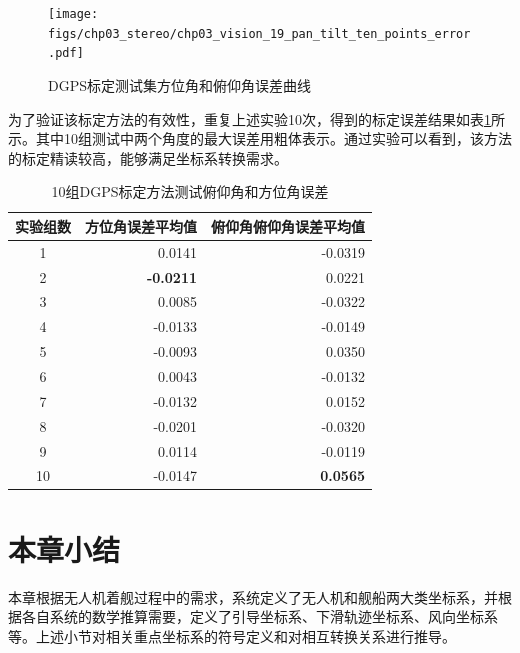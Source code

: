 \begin{figure}[htb]
	\centering
	\texttt{[image: figs/chp03\_stereo/chp03\_vision\_19\_pan\_tilt\_ten\_points\_error.pdf]}	
	\caption{DGPS标定测试集方位角和俯仰角误差曲线}
	\label{fig:chp03_vision_19_pan_tilt_ten_points_error}
\end{figure}

为了验证该标定方法的有效性，重复上述实验10次，得到的标定误差结果如表\ref{label:DGPS_10_Test_Results}所示。其中10组测试中两个角度的最大误差用粗体表示。通过实验可以看到，该方法的标定精读较高，能够满足坐标系转换需求。
\begin{table}[htb]
	\centering
	\caption{10组DGPS标定方法测试俯仰角和方位角误差}
	\label{label:DGPS_10_Test_Results}
	\begin{tabular}{crr}
		\hline
		实验组数 & \multicolumn{1}{c}{方位角误差平均值} & \multicolumn{1}{c}{俯仰角俯仰角误差平均值} \\ \hline
		1    & 0.0141                       & -0.0319                         \\
		2    & \textbf{-0.0211}             & 0.0221                          \\
		3    & 0.0085                       & -0.0322                \\
		4    & -0.0133                      & -0.0149                         \\
		5    & -0.0093                      & 0.0350                          \\
		6    & 0.0043                       & -0.0132                         \\
		7    & -0.0132                      & 0.0152                          \\
		8    & -0.0201                      & -0.0320                         \\
		9    & 0.0114                       & -0.0119                         \\
		10   & -0.0147                      & \textbf{0.0565}                          \\ \hline
	\end{tabular}
\end{table}




\section{本章小结}
本章根据无人机着舰过程中的需求，系统定义了无人机和舰船两大类坐标系，并根据各自系统的数学推算需要，定义了引导坐标系、下滑轨迹坐标系、风向坐标系等。上述小节对相关重点坐标系的符号定义和对相互转换关系进行推导。





